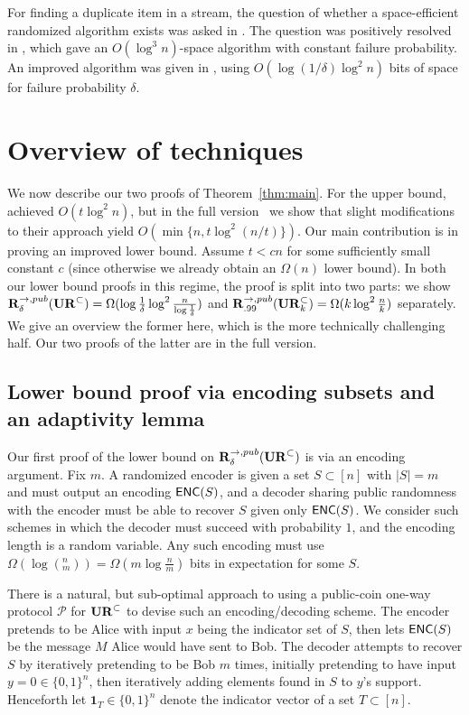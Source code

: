 For finding a duplicate item in a stream, the question of whether a space-efficient randomized algorithm exists was asked in \cite{Muthukrishnan05,Tarui07}. The question was positively resolved in \cite{GopalanR09}, which gave an $O(\log^3 n)$-space algorithm with constant failure probability. An improved algorithm was given in \cite{JowhariST11}, using $O(\log(1/\delta) \log^2 n)$ bits of space for failure probability $\delta$.

\vspace{-.1in}\section{Overview of techniques}\label{sec:overview}
We now describe our two proofs of Theorem~\ref{thm:main}. For the upper bound, \cite{JowhariST11} achieved $O(t\log^2n)$, but in the full version~\cite{KapralovNPWWY17} we show that slight modifications to their approach yield $O(\min\{n,t\log^2(n/t)\})$. Our main contribution is in proving an improved lower bound. Assume $t < cn$ for some sufficiently small constant $c$ (since otherwise we already obtain an $\Omega(n)$ lower bound). In both our lower bound proofs in this regime, the proof is split into two parts: we show $\mathbf{R}^{\rightarrow,pub}_\delta(\mathbf{UR}^\subset) = \Omega(\log \frac 1{\delta}\log^2 \frac n{\log\frac 1{\delta}})$ and $\mathbf{R}^{\rightarrow,pub}_{.99}(\mathbf{UR}_k^\subset)=\Omega(k\log^2\frac nk)$ separately. We give an overview the former here, which is the more technically challenging half. Our two proofs of the latter are in the full version.

\subsection{Lower bound proof via encoding subsets and an adaptivity lemma}\label{sec:adaptivity-intro}

Our first proof of the lower bound on $\mathbf{R}^{\rightarrow,pub}_\delta(\mathbf{UR}^\subset)$ is via an encoding argument. Fix $m$. A randomized encoder is given a set $S\subset[n]$ with $|S| = m$ and must output an encoding $\textsf{ENC}(S)$, and a decoder sharing public randomness with the encoder must be able to recover $S$ given only $\textsf{ENC}(S)$. We consider such schemes in which the decoder must succeed with probability $1$, and the encoding length is a random variable. Any such encoding must use $\Omega(\log(^n_m)) = \Omega(m\log \frac nm)$ bits in expectation for some $S$.

There is a natural, but sub-optimal approach to using a public-coin one-way protocol $\mathcal{P}$ for $\mathbf{UR}^\subset$ to devise such an encoding/decoding scheme.  The encoder pretends to be Alice with input $x$ being the indicator set of $S$, then lets $\textsf{ENC}(S)$ be the message $M$ Alice would have sent to Bob. The decoder attempts to recover $S$ by iteratively pretending to be Bob $m$ times, initially pretending to have input $y=0\in\{0,1\}^n$, then iteratively adding elements found in $S$ to $y$'s support. Henceforth let $\mathbf{1}_T\in\{0,1\}^n$ denote the indicator vector of a set $T\subset[n]$.

